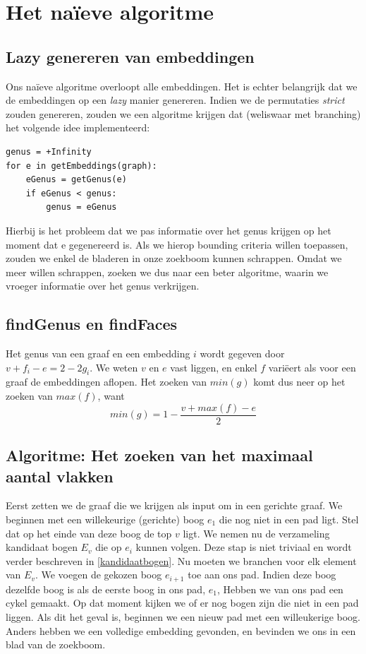 \documentclass{article}
\begin{document}
\section{Het na\"ieve algoritme}

\subsection{Lazy genereren van embeddingen}
Ons na\"ieve algoritme overloopt alle embeddingen. Het is echter belangrijk dat
we de embeddingen op een \emph{lazy} manier genereren. Indien we de permutaties
\emph{strict} zouden genereren, zouden we een algoritme krijgen dat (weliswaar
met branching) het volgende idee implementeerd:

\lstset{language=Python}
\begin{lstlisting}
genus = +Infinity
for e in getEmbeddings(graph):
    eGenus = getGenus(e)
    if eGenus < genus:
        genus = eGenus
\end{lstlisting}

Hierbij is het probleem dat we pas informatie over het genus krijgen op het
moment dat e gegenereerd is. Als we hierop bounding criteria willen toepassen,
zouden we enkel de bladeren in onze zoekboom kunnen schrappen. Omdat we meer
willen schrappen, zoeken we dus naar een beter algoritme, waarin we vroeger
informatie over het genus verkrijgen.
\newline

\subsection{findGenus en findFaces}
Het genus van een graaf en een embedding $i$ wordt gegeven door
$v + f_i - e = 2 - 2g_i$. We weten $v$ en $e$ vast liggen, en enkel $f$ vari\"eert
als voor een graaf de embeddingen aflopen. Het zoeken van $min(g)$ komt dus
neer op het zoeken van $max(f)$, want
\begin{equation*}
min(g) = 1 - \frac{v + max(f) - e}{2}
\end{equation*}

\subsection{Algoritme: Het zoeken van het maximaal aantal vlakken}
Eerst zetten we de graaf die we krijgen als input om in een gerichte graaf. We
beginnen met een willekeurige (gerichte) boog $e_1$ die nog niet in een pad
ligt.  Stel dat op het einde van deze boog de top $v$ ligt. We nemen nu de
verzameling kandidaat bogen $E_v$ die op $e_i$ kunnen volgen. Deze stap is niet
triviaal en wordt verder beschreven in \ref{kandidaatbogen}. Nu moeten we branchen
voor elk element van $E_v$. We voegen de gekozen boog $e_{i+1}$ toe aan ons pad.
Indien deze boog dezelfde boog is als de eerste boog in ons pad, $e_1$, Hebben
we van ons pad een cykel gemaakt. Op dat moment kijken we of er nog bogen zijn
die niet in een pad liggen. Als dit het geval is, beginnen we een nieuw pad met
een willeukerige boog. Anders hebben we een volledige embedding gevonden, en
bevinden we ons in een blad van de zoekboom.
\newline
\end{document}
